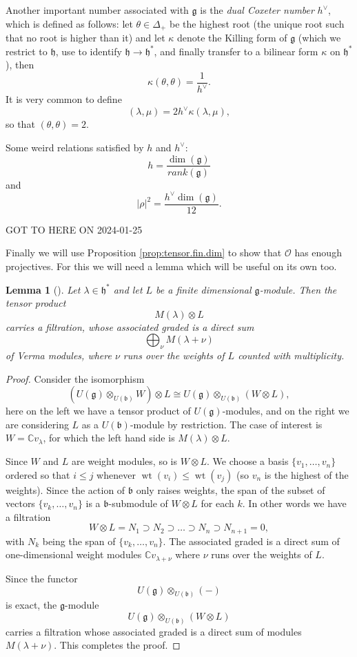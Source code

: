 \documentclass[12pt]{article}
\theoremstyle{plain}
\newtheorem{lemma}[thm]{Lemma}
\theoremstyle{definition}
\numberwithin{equation}{section}
\DeclareMathOperator{\wt}{wt}
\newcommand{\la}{\lambda}
\newcommand{\D}{\Delta}
\newcommand{\C}{\mathbb{C}}
\newcommand{\g}{\mathfrak{g}}
\newcommand{\h}{\mathfrak{h}}
\newcommand{\fb}{\mathfrak{b}}
\newcommand{\OO}{\mathcal{O}}
\begin{document}
Another important number associated with $\g$ is the \emph{dual Coxeter number} $h^\vee$, which is defined as follows: let $\theta \in \D_+$ be the highest root (the unique root such that no root is higher than it) and let $\kappa$ denote the Killing form of $\g$ (which we restrict to $\h$, use to identify $\h \rightarrow \h^*$, and finally transfer to a bilinear form $\kappa$ on $\h^*$), then
\[
\kappa(\theta, \theta) = \frac{1}{h^\vee}.
\]
It is very common to define
\[
(\lambda, \mu) = 2 h^\vee \kappa(\la, \mu),
\]
so that $(\theta, \theta) = 2$.

Some weird relations satisfied by $h$ and $h^\vee$:
\[
h = \frac{\dim(\g)}{rank(\g)}
\]
and
\[
|\rho|^2 = \frac{h^\vee \dim(\g)}{12}.
\]





{\color{red}GOT TO HERE ON 2024-01-25}


Finally we will use Proposition \ref{prop:tensor.fin.dim} to show that $\OO$ has enough projectives. For this we will need a lemma which will be useful on its own too.
\begin{lemma}[{\cite[Theorem 3.6]{humbgg}}]\label{lem:Verma.filtration}
Let $\lambda \in \h^*$ and let $L$ be a finite dimensional $\g$-module. Then the tensor product
\[
M(\lambda) \otimes L
\]
carries a filtration, whose associated graded is a direct sum
\[
\bigoplus_{\nu} M(\lambda+\nu)
\]
of Verma modules, where $\nu$ runs over the weights of $L$ counted with multiplicity.
\end{lemma}

\begin{proof}
Consider the isomorphism
\[
(U(\g) \otimes_{U(\fb)} W) \otimes L \cong U(\g) \otimes_{U(\fb)} (W \otimes L),
\]
here on the left we have a tensor product of $U(\g)$-modules, and on the right we are considering $L$ as a $U(\fb)$-module by restriction. The case of interest is $W = \C v_\la$, for which the left hand side is $M(\la) \otimes L$.

Since $W$ and $L$ are weight modules, so is $W \otimes L$. We choose a basis $\{v_1, \ldots, v_n\}$ ordered so that $i \leq j$ whenever $\wt(v_i) \leq \wt(v_j)$ (so $v_n$ is the highest of the weights). Since the action of $\fb$ only raises weights, the span of the subset of vectors $\{v_k, \ldots, v_n\}$ is a $\fb$-submodule of $W \otimes L$ for each $k$. In other words we have a filtration
\[
W \otimes L = N_1 \supset N_2 \supset \ldots \supset N_n \supset N_{n+1} = 0,
\]
with $N_k$ being the span of $\{v_k, \ldots, v_n\}$. The associated graded is a direct sum of one-dimensional weight modules $\C v_{\la+\nu}$ where $\nu$ runs over the weights of $L$.

Since the functor
\[
U(\g) \otimes_{U(\fb)} (-)
\]
is exact, the $\g$-module
\[
U(\g) \otimes_{U(\fb)} (W \otimes L)
\]
carries a filtration whose associated graded is a direct sum of modules $M(\la+\nu)$. This completes the proof.
\end{proof}
\end{document}
